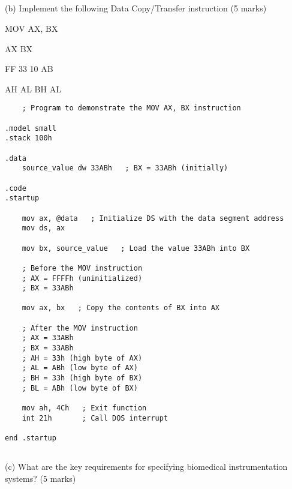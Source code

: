 \documentclass[article]{article}
\begin{document}
\newpage


\subsection*{}(b) Implement the following Data Copy/Transfer instruction (5 marks)

MOV AX, BX 

AX BX


FF 33 10 AB


AH AL BH AL


\begin{lstlisting}
    ; Program to demonstrate the MOV AX, BX instruction

.model small
.stack 100h

.data
    source_value dw 33ABh   ; BX = 33ABh (initially)

.code
.startup

    mov ax, @data   ; Initialize DS with the data segment address
    mov ds, ax

    mov bx, source_value   ; Load the value 33ABh into BX

    ; Before the MOV instruction
    ; AX = FFFFh (uninitialized)
    ; BX = 33ABh

    mov ax, bx   ; Copy the contents of BX into AX

    ; After the MOV instruction
    ; AX = 33ABh
    ; BX = 33ABh
    ; AH = 33h (high byte of AX)
    ; AL = ABh (low byte of AX)
    ; BH = 33h (high byte of BX)
    ; BL = ABh (low byte of BX)

    mov ah, 4Ch   ; Exit function
    int 21h       ; Call DOS interrupt

end .startup
\end{lstlisting}
\subsection*{}(c) What are the key requirements for specifying biomedical instrumentation systems?
(5 marks)
\end{document}
